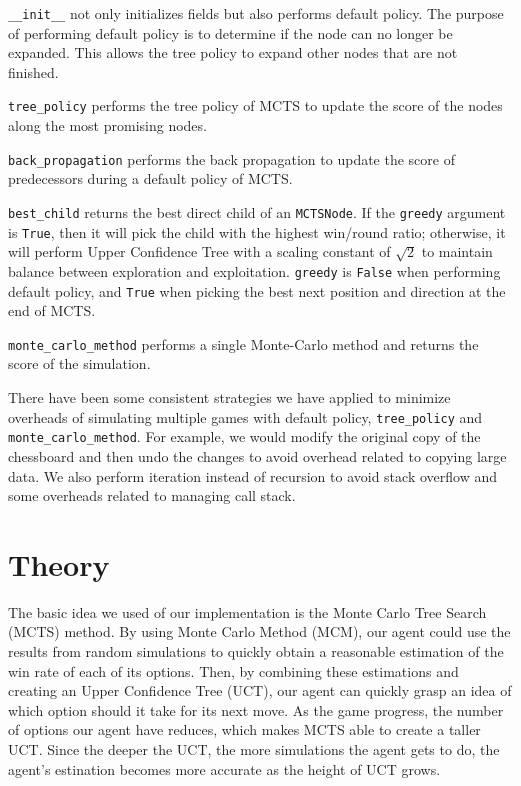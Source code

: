 \documentclass[twoside,11pt]{article}
\begin{document}
\texttt{\_\_init\_\_} not only initializes fields but also performs default policy.
The purpose of performing default policy is to determine if the node can no longer be expanded.
This allows the tree policy to expand other nodes that are not finished.

\texttt{tree\_policy} performs the tree policy of MCTS to update the score of the nodes along the most promising nodes.

\texttt{back\_propagation} performs the back propagation to update the score of predecessors during a default policy of MCTS.

\texttt{best\_child} returns the best direct child of an \texttt{MCTSNode}.
If the \texttt{greedy} argument is \texttt{True}, then it will pick the child with the highest win/round ratio;
otherwise, it will perform Upper Confidence Tree with a scaling constant of \(\sqrt{2}\) to maintain balance between exploration and exploitation.
\texttt{greedy} is \texttt{False} when performing default policy, and \texttt{True} when picking the best next position and direction at the end of MCTS.

\texttt{monte\_carlo\_method} performs a single Monte-Carlo method and returns the score of the simulation.

There have been some consistent strategies we have applied to minimize overheads of simulating multiple games with default policy, \texttt{tree\_policy} and \texttt{monte\_carlo\_method}.
For example, we would modify the original copy of the chessboard and then undo the changes to avoid overhead related to copying large data.
We also perform iteration instead of recursion to avoid stack overflow and some overheads related to managing call stack.

\section{Theory}
The basic idea we used of our implementation is the Monte Carlo Tree Search (MCTS) method.
By using Monte Carlo Method (MCM), our agent could use the results from random simulations to quickly obtain a reasonable estimation of the win rate of each of its options.
Then, by combining these estimations and creating an Upper Confidence Tree (UCT), our agent can quickly grasp an idea of which option should it take for its next move. 
As the game progress, the number of options our agent have reduces, which makes MCTS able to create a taller UCT. 
Since the deeper the UCT, the more simulations the agent gets to do, the agent's estination becomes more accurate as the height of UCT grows.
\end{document}
